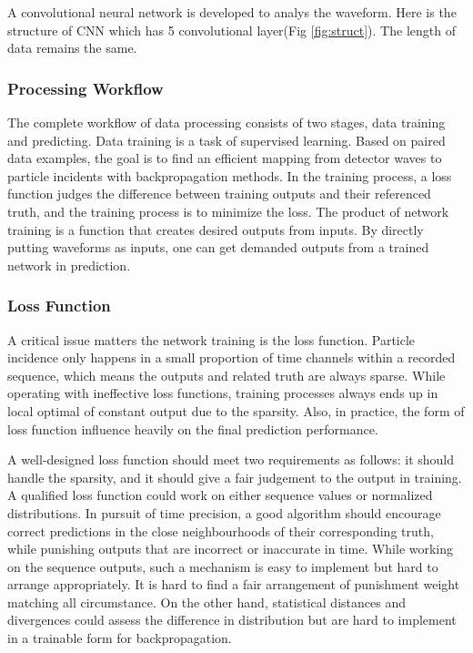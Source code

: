 A convolutional neural network is developed to analys the waveform. Here is the structure of CNN which has 5 convolutional layer(Fig \ref{fig:struct}). The length of data remains the same. 

\subsubsection{Processing Workflow}
The complete workflow of data processing consists of two stages, data training and predicting. Data training is a task of supervised learning.  Based on paired data examples, the goal is to find an efficient mapping from detector waves to particle incidents with backpropagation methods. In the training process, a loss function judges the difference between training outputs and their referenced truth, and the training process is to minimize the loss. The product of network training is a function that creates desired outputs from inputs. By directly putting waveforms as inputs, one can get demanded outputs from a trained network in prediction.

\subsubsection{Loss Function}
A critical issue matters the network training is the loss function. Particle incidence only happens in a small proportion of time channels within a recorded sequence, which means the outputs and related truth are always sparse. While operating with ineffective loss functions, training processes always ends up in local optimal of constant output due to the sparsity. Also, in practice, the form of loss function influence heavily on the final prediction performance. 

A well-designed loss function should meet two requirements as follows: it should handle the sparsity, and it should give a fair judgement to the output in training. A qualified loss function could work on either sequence values or normalized distributions. In pursuit of time precision, a good algorithm should encourage correct predictions in the close neighbourhoods of their corresponding truth, while punishing outputs that are incorrect or inaccurate in time. While working on the sequence outputs, such a mechanism is easy to implement but hard to arrange appropriately. It is hard to find a fair arrangement of punishment weight matching all circumstance. On the other hand, statistical distances and divergences could assess the difference in distribution but are hard to implement in a trainable form for backpropagation. 

